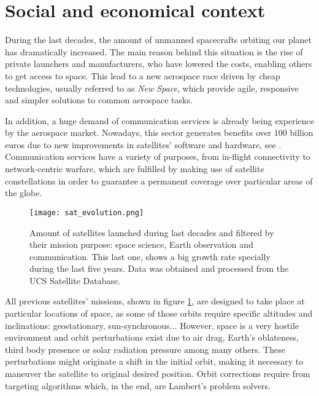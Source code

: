\section{Social and economical context}

During the last decades, the amount of unmanned spacecrafts orbiting our planet
has dramatically increased. The main reason behind this situation is the rise of
private launchers and manufacturers, who have lowered the costs, enabling others
to get access to space. This lead to a new aerospace race driven by cheap
technologies, usually referred to as \textit{New Space}, which provide agile,
responsive and simpler solutions to common aerospace tasks.

In addition, a huge demand of communication services is already being experience
by the aerospace market.  Nowadays, this sector generates benefits over $100$
billion euros due to new improvements in satellites' software and hardware, see
\cite{airbus2021}.  Communication services have a variety of purposes, from
in-flight connectivity to network-centric warfare, which are fulfilled by making
use of satellite constellations in order to guarantee a permanent coverage over
particular areas of the globe.


\begin{figure}[h]
  \centering
  \texttt{[image: sat\_evolution.png]}
  \caption[Launched satellites per year.]{Amount of satellites launched during last decades and filtered by their
    mission purpose: space science, Earth observation and communication. This
    last one, shows a big growth rate specially during the last five years. Data
    was obtained and processed from the UCS Satellite Database.}
  \label{fig:sat_evolution}
\end{figure}

All previous satellites' missions, shown in figure \ref{fig:sat_evolution}, are
designed to take place at particular locations of space, as some of those orbits
require specific altitudes and inclinations: geostationary, sun-synchronous...
However, space is a very hostile environment and orbit perturbations exist due
to air drag, Earth's oblateness, third body presence or solar radiation pressure
among many others. These perturbations might originate a shift in the initial
orbit, making it necessary to maneuver the satellite to original desired
position. Orbit corrections require from targeting algorithms which, in the end,
are Lambert's problem solvers.

